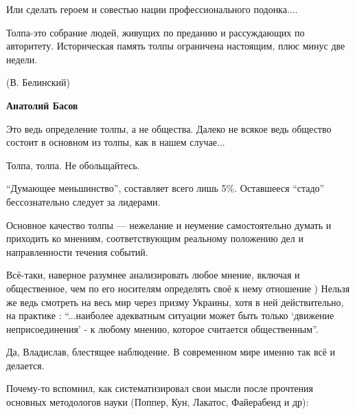  
 
 
 
 
\zzSecCmt

\begin{itemize} %
Или сделать героем и совестью нации профессионального подонка....


Толпа-это собрание людей, живущих по преданию и рассуждающих по авторитету.
Историческая память толпы ограничена настоящим, плюс минус две недели.

(В. Белинский)

\begin{itemize} %
\textbf{Анатолий Басов} 

Это ведь определение толпы, а не общества. Далеко не всякое ведь общество
состоит в основном из толпы, как в нашем случае...


Толпа, толпа. Не обольщайтесь.

\enquote{Думающее меньшинство}, составляет всего лишь 5\%. Оставшееся
\enquote{стадо} бессознательно следует за лидерами.

Основное качество толпы — нежелание и неумение самостоятельно думать и
приходить ко мнениям, соответствующим реальному положению дел и направленности
течения событий.
\end{itemize} %


Всё-таки, наверное разумнее анализировать любое мнение, включая и общественное,
чем по его носителям определять своё к нему отношение ) Нельзя же ведь смотреть
на весь мир через призму Украины, хотя в ней действительно, на практике :
\enquote{...наиболее адекватным ситуации может быть только \enquote{движение неприсоединения} -
к любому мнению, которое считается общественным}.


Да, Владислав, блестящее наблюдение. В современном мире именно так всё и делается.


Почему-то вспомнил, как систематизировал свои мысли после прочтения основных
методологов науки (Поппер, Кун, Лакатос, Файерабенд и др):


\end{itemize}
